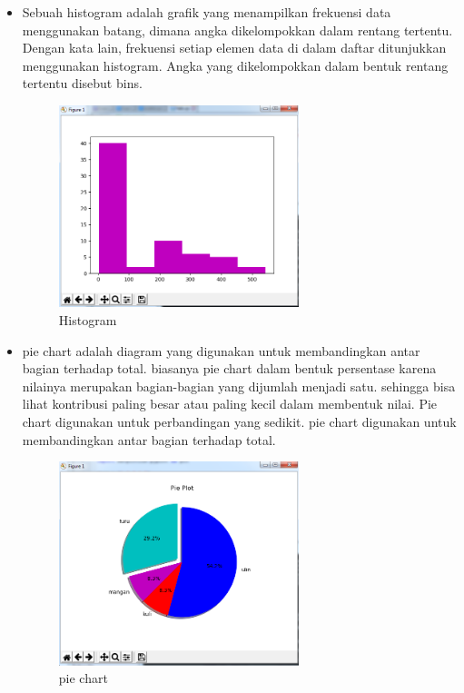 \begin{enumerate}
\begin{itemize}
\item Sebuah histogram adalah grafik yang menampilkan frekuensi data menggunakan batang, dimana angka dikelompokkan dalam rentang tertentu. Dengan kata lain, frekuensi setiap elemen data di dalam daftar ditunjukkan menggunakan histogram. Angka yang dikelompokkan dalam bentuk rentang tertentu disebut bins.

\begin{figure}[H]
\centering
\includegraphics[width=7cm]{figures/6/1174050/Teori/3histo.png}
\caption{Histogram}
\end{figure}


\item pie chart adalah diagram yang digunakan untuk membandingkan antar bagian terhadap total. biasanya pie chart dalam bentuk persentase karena nilainya merupakan bagian-bagian yang dijumlah menjadi satu. sehingga bisa lihat kontribusi paling besar atau paling kecil dalam membentuk nilai. Pie chart digunakan untuk perbandingan yang sedikit. pie chart digunakan untuk membandingkan antar bagian terhadap total.

\begin{figure}[H]
\centering
\includegraphics[width=7cm]{figures/6/1174050/Teori/3pie.png}
\caption{pie chart}
\end{figure}


\end{itemize}
\end{enumerate}
